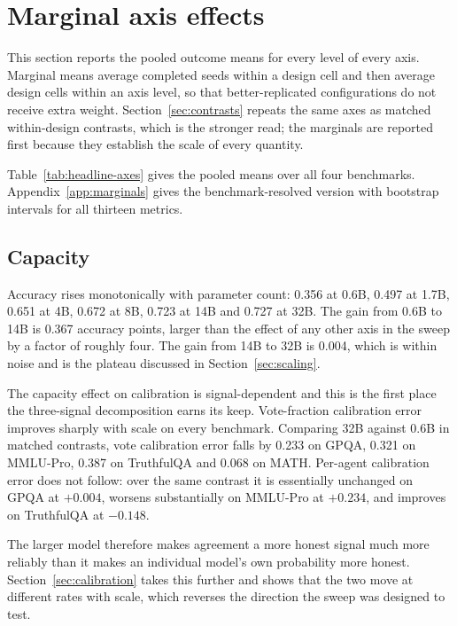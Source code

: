 \section{Marginal axis effects}
\label{sec:marginals}

This section reports the pooled outcome means for every level of every axis. Marginal
means average completed seeds within a design cell and then average design cells within an
axis level, so that better-replicated configurations do not receive extra weight.
Section~\ref{sec:contrasts} repeats the same axes as matched within-design contrasts, which
is the stronger read; the marginals are reported first because they establish the scale of
every quantity.

Table~\ref{tab:headline-axes} gives the pooled means over all four benchmarks.
Appendix~\ref{app:marginals} gives the benchmark-resolved version with bootstrap intervals
for all thirteen metrics.


\subsection{Capacity}

Accuracy rises monotonically with parameter count: 0.356 at 0.6B, 0.497 at 1.7B, 0.651 at
4B, 0.672 at 8B, 0.723 at 14B and 0.727 at 32B. The gain from 0.6B to 14B is 0.367
accuracy points, larger than the effect of any other axis in the sweep by a factor of
roughly four. The gain from 14B to 32B is 0.004, which is within noise and is the plateau
discussed in Section~\ref{sec:scaling}.

The capacity effect on calibration is signal-dependent and this is the first place the
three-signal decomposition earns its keep. Vote-fraction calibration error improves
sharply with scale on every benchmark. Comparing 32B against 0.6B in matched contrasts,
vote calibration error falls by 0.233 on GPQA, 0.321 on MMLU-Pro, 0.387 on TruthfulQA and
0.068 on MATH. Per-agent calibration error does not follow: over the same contrast it is
essentially unchanged on GPQA at $+0.004$, worsens substantially on MMLU-Pro at $+0.234$,
and improves on TruthfulQA at $-0.148$.

The larger model therefore makes agreement a more honest signal much more reliably than it
makes an individual model's own probability more honest. Section~\ref{sec:calibration}
takes this further and shows that the two move at different rates with scale, which
reverses the direction the sweep was designed to test.

